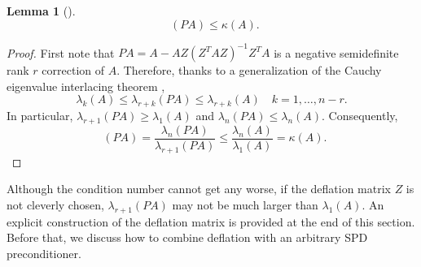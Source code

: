 \documentclass{article}
\numberwithin{equation}{section}
\DeclareMathOperator{\keff}{\kappa_{\operatorname{eff}}}
\theoremstyle{definition}
\newtheorem{lemma}[definition]{Lemma}
\begin{document}
\begin{lemma}[{\cite[Theorem 2.1]{vuik2005deflation}}]
\label{lem: cond_defl}
\begin{equation*}
    \keff(PA) \leq \kappa(A).
\end{equation*}  
\end{lemma}
\begin{proof}
First note that $PA = A-AZ(Z^TAZ)^{-1}Z^TA$ is a negative semidefinite rank $r$ correction of $A$. Therefore, thanks to a generalization of the Cauchy eigenvalue interlacing theorem \cite{thompson1976behavior},
\begin{equation*}
    \lambda_k(A) \leq \lambda_{r+k}(PA) \leq \lambda_{r+k}(A) \quad k=1,\dots,n-r.
\end{equation*}
In particular, $\lambda_{r+1}(PA) \geq \lambda_1(A)$ and $\lambda_n(PA) \leq \lambda_n(A)$. Consequently,
\begin{equation*}
    \keff(PA) = \frac{\lambda_n(PA)}{\lambda_{r+1}(PA)} \leq \frac{\lambda_n(A)}{\lambda_1(A)} = \kappa(A).
\end{equation*}
\end{proof}

Although the condition number cannot get any worse, if the deflation matrix $Z$ is not cleverly chosen, $\lambda_{r+1}(PA)$ may not be much larger than $\lambda_1(A)$. An explicit construction of the deflation matrix is provided at the end of this section. Before that, we discuss how to combine deflation with an arbitrary SPD preconditioner.
\end{document}
